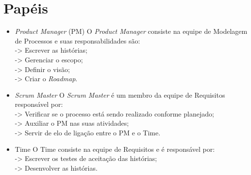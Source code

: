\section{Papéis}

\begin{itemize}
  \item \textit{Product Manager} (PM)
 \subitem O \textit{Product Manager} consiste na equipe de Modelagem de Processos e suas responsabilidades são: \\
      \subitem-> Escrever as histórias;\\
      \subitem-> Gerenciar o escopo; \\
      \subitem-> Definir o visão; \\
      \subitem-> Criar o \textit{Roadmap}.\\

      
  \item \textit{Scrum Master}
 \subitem O  \textit{Scrum Master} é um membro da equipe de Requisitos responsável por: \\
      \subitem-> Verificar se o processo está sendo realizado conforme planejado;\\
      \subitem-> Auxiliar o PM nas suas atividades; \\
      \subitem-> Servir de elo de ligação entre o PM e o Time. \\

  \item Time
 \subitem O  Time consiste na equipe de Requisitos e é responsável por: \\
      \subitem-> Escrever os testes de aceitação das histórias;\\
      \subitem-> Desenvolver as histórias. \\
\end{itemize}
